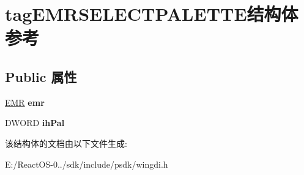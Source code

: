 \hypertarget{structtag_e_m_r_s_e_l_e_c_t_p_a_l_e_t_t_e}{}\section{tag\+E\+M\+R\+S\+E\+L\+E\+C\+T\+P\+A\+L\+E\+T\+T\+E结构体 参考}
\label{structtag_e_m_r_s_e_l_e_c_t_p_a_l_e_t_t_e}
\subsection*{Public 属性}
\begin{DoxyCompactItemize}
\item 
\mbox{\label{structtag_e_m_r_s_e_l_e_c_t_p_a_l_e_t_t_e_a7791a06d57e09299fdfeb6bd77b9ae1e}} 
\hyperlink{structtag_e_m_r}{E\+MR} {\bfseries emr}
\item 
\mbox{\label{structtag_e_m_r_s_e_l_e_c_t_p_a_l_e_t_t_e_a5acb1c349769ae16eb82361b7e5947ce}} 
D\+W\+O\+RD {\bfseries ih\+Pal}
\end{DoxyCompactItemize}


该结构体的文档由以下文件生成\+:\begin{DoxyCompactItemize}
\item 
E\+:/\+React\+O\+S-\/0../sdk/include/psdk/wingdi.\+h\end{DoxyCompactItemize}
